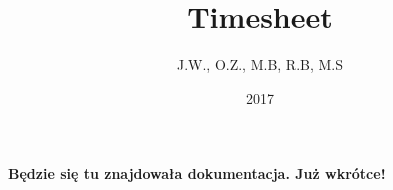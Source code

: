 \documentclass[a4paper, 12pt, twoside]{article}
\title{Timesheet}
\author{J.W., O.Z., M.B, R.B, M.S}
\date{2017}
\begin{document}
\paragraph{Będzie się tu znajdowała dokumentacja. Już wkrótce!}
\end{document}
